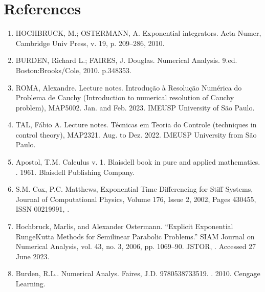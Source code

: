 \documentclass[letterpaper,10pt,english]{jupyterBook}
\begin{document}
\section{References}
\label{\detokenize{References:references}}\label{\detokenize{References::doc}}\begin{enumerate}
%
\item {} 
\sphinxAtStartPar
HOCHBRUCK, M.; OSTERMANN, A. Exponential integrators. Acta Numer, Cambridge Univ Press, v. 19, p. 209–286, 2010.

\item {} 
\sphinxAtStartPar
BURDEN, Richard L.; FAIRES, J. Douglas. Numerical Analysis. 9.ed. Boston:Brooks/Cole, 2010. p.348\sphinxhyphen{}353.

\item {} 
\sphinxAtStartPar
ROMA, Alexandre. Lecture notes. Introdução à Resolução Numérica do Problema de Cauchy (Introduction to numerical resolution of Cauchy problem), MAP5002. Jan. and Feb. 2023. IME\sphinxhyphen{}USP University of São Paulo.

\item {} 
\sphinxAtStartPar
TAL, Fábio A. Lecture notes. Técnicas em Teoria do Controle (techniques in control theory), MAP2321. Aug. to Dez. 2022. IME\sphinxhyphen{}USP University from São Paulo.

\item {} 
\sphinxAtStartPar
Apostol, T.M. Calculus v. 1. Blaisdell book in pure and applied mathematics. . 1961. Blaisdell Publishing Company.

\item {} 
\sphinxAtStartPar
S.M. Cox, P.C. Matthews, Exponential Time Differencing for Stiff Systems, Journal of Computational Physics, Volume 176, Issue 2, 2002, Pages 430\sphinxhyphen{}455, ISSN 0021\sphinxhyphen{}9991, .

\item {} 
\sphinxAtStartPar
Hochbruck, Marlis, and Alexander Ostermann. “Explicit Exponential Runge\sphinxhyphen{}Kutta Methods for Semilinear Parabolic Problems.” SIAM Journal on Numerical Analysis, vol. 43, no. 3, 2006, pp. 1069–90. JSTOR, . Accessed 27 June 2023.

\item {} 
\sphinxAtStartPar
Burden, R.L.. Numerical Analys. Faires, J.D. 9780538733519. . 2010. Cengage Learning.

\end{enumerate}
\end{document}
